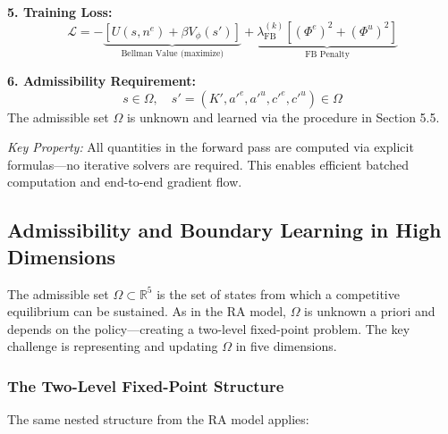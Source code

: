 \begin{center}
{{\vspace{0.3em}
\textbf{5. Training Loss:}
\begin{equation}
    \mathcal{L} = -\underbrace{\left[ U(s, n^e) + \beta V_\phi(s') \right]}_{\text{Bellman Value (maximize)}} + \underbrace{\lambda_{\text{FB}}^{(k)} \left[ (\Phi^e)^2 + (\Phi^u)^2 \right]}_{\text{FB Penalty}}
\end{equation}

\vspace{0.3em}
\textbf{6. Admissibility Requirement:}
\begin{equation}
    s \in \Omega, \quad s' = (K', a'^e, a'^u, c'^e, c'^u) \in \Omega
\end{equation}
The admissible set $\Omega$ is unknown and learned via the procedure in Section 5.5.
}}
\end{center}

\vspace{0.5em}
\textit{Key Property:} All quantities in the forward pass are computed via explicit formulas—no iterative solvers are required. This enables efficient batched computation and end-to-end gradient flow.


\subsection{Admissibility and Boundary Learning in High Dimensions}

The admissible set $\Omega \subset \mathbb{R}^5$ is the set of states from which a competitive equilibrium can be sustained. As in the RA model, $\Omega$ is unknown a priori and depends on the policy—creating a two-level fixed-point problem. The key challenge is representing and updating $\Omega$ in five dimensions.

\subsubsection{The Two-Level Fixed-Point Structure}

The same nested structure from the RA model applies:

